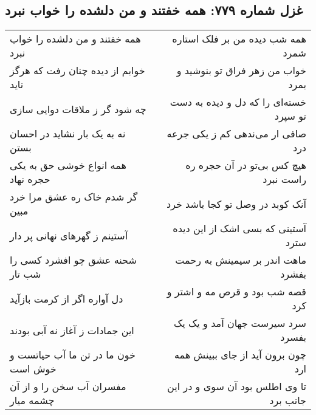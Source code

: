 \begin{center}
\section*{غزل شماره ۷۷۹: همه خفتند و من دلشده را خواب نبرد}
\label{sec:0779}
\begin{longtable}{l p{0.5cm} r}
همه خفتند و من دلشده را خواب نبرد
&&
همه شب دیده من بر فلک استاره شمرد
\\
خوابم از دیده چنان رفت که هرگز ناید
&&
خواب من زهر فراق تو بنوشید و بمرد
\\
چه شود گر ز ملاقات دوایی سازی
&&
خسته‌ای را که دل و دیده به دست تو سپرد
\\
نه به یک بار نشاید در احسان بستن
&&
صافی ار می‌ندهی کم ز یکی جرعه درد
\\
همه انواع خوشی حق به یکی حجره نهاد
&&
هیچ کس بی‌تو در آن حجره ره راست نبرد
\\
گر شدم خاک ره عشق مرا خرد مبین
&&
آنک کوبد در وصل تو کجا باشد خرد
\\
آستینم ز گهرهای نهانی پر دار
&&
آستینی که بسی اشک از این دیده سترد
\\
شحنه عشق چو افشرد کسی را شب تار
&&
ماهت اندر بر سیمینش به رحمت بفشرد
\\
دل آواره اگر از کرمت بازآید
&&
قصه شب بود و قرص مه و اشتر و کرد
\\
این جمادات ز آغاز نه آبی بودند
&&
سرد سیرست جهان آمد و یک یک بفسرد
\\
خون ما در تن ما آب حیاتست و خوش است
&&
چون برون آید از جای ببینش همه ارد
\\
مفسران آب سخن را و از آن چشمه میار
&&
تا وی اطلس بود آن سوی و در این جانب برد
\\
\end{longtable}
\end{center}
